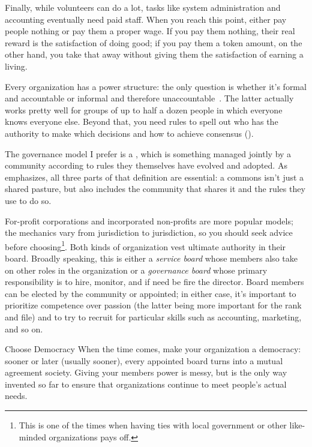 Finally, 
while volunteers can do a lot,
tasks like system administration and accounting eventually need paid staff.
When you reach this point,
either pay people nothing or pay them a proper wage.
If you pay them nothing,
their real reward is the satisfaction of doing good;
if you pay them a token amount,
on the other hand,
you take that away without giving them the satisfaction of earning a living.


Every organization has a power structure:
the only question is
whether it's formal and accountable or informal and therefore unaccountable~\cite{Free1972}.
The latter actually works pretty well for groups of up to half a dozen people
in which everyone knows everyone else.
Beyond that,
you need rules to spell out
who has the authority to make which decisions
and how to achieve consensus ().

The governance model I prefer is a ,
which is something managed jointly by a community
according to rules they themselves have evolved and adopted.
As~\cite{Boll2014} emphasizes,
all three parts of that definition are essential:
a commons isn't just a shared pasture,
but also includes the community that shares it
and the rules they use to do so.

For-profit corporations and incorporated non-profits are more popular models;
the mechanics vary from jurisdiction to jurisdiction,
so you should seek advice before choosing\footnote{This is one of the times when
  having ties with local government or other like-minded organizations pays off.}.
Both kinds of organization vest ultimate authority in their board.
Broadly speaking, this is either a \emph{service board}
whose members also take on other roles in the organization
or a \emph{governance board} whose primary responsibility is to hire, monitor,
and if need be fire the director.
Board members can be elected by the community or appointed;
in either case,
it's important to prioritize competence over passion
(the latter being more important for the rank and file)
and to try to recruit for particular skills such as accounting, marketing, and so on.

\begin{aside}{Choose Democracy}
  When the time comes,
  make your organization a democracy:
  sooner or later (usually sooner),
  every appointed board turns into a mutual agreement society.
  Giving your members power is messy,
  but is the only way invented so far to ensure that
  organizations continue to meet people's actual needs.
\end{aside}

